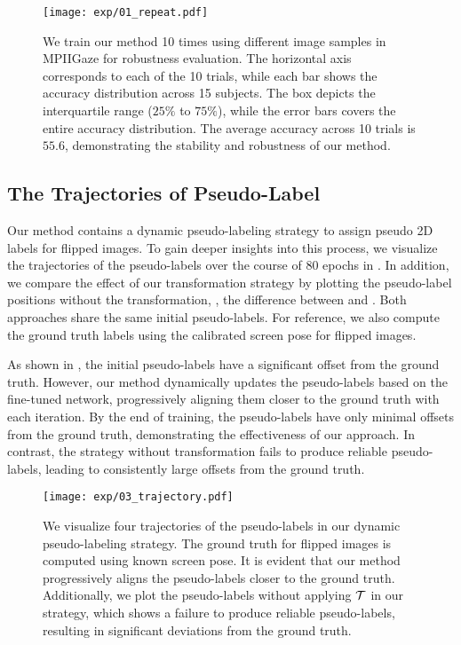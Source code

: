 \begin{figure}[t]
	\begin{center}
		\texttt{[image: exp/01\_repeat.pdf]}	
	\end{center}
    \vspace{-2mm}
	\caption{We train our method 10 times using different image samples in MPIIGaze for robustness evaluation.  The horizontal axis corresponds to each of the 10 trials, while each bar shows the accuracy distribution across 15 subjects.  The box depicts the interquartile range ($25\%$ to $75\%$), while the error bars covers the entire accuracy distribution. The average accuracy across  10 trials is $55.6$, demonstrating the stability and robustness of our method. \vspace{-6mm} }
	\label{fig:repeat}
\end{figure}


\subsection{The Trajectories of Pseudo-Label}
Our method contains a dynamic pseudo-labeling strategy to assign pseudo 2D labels for flipped images. To gain deeper insights into this process, we visualize the trajectories of the pseudo-labels over the course of 80 epochs in .
In addition, we compare the effect of our transformation strategy by plotting the pseudo-label positions without the transformation, \ie, the difference  between  and . 
Both approaches share the same initial pseudo-labels. For reference, we also compute the ground truth labels using the calibrated screen pose for flipped images.

As shown in  , the initial pseudo-labels have a significant offset from the ground truth. However, our method dynamically updates the pseudo-labels based on the fine-tuned network, progressively aligning them closer to the ground truth with each iteration. By the end of training, the pseudo-labels have only minimal offsets from the ground truth, demonstrating the effectiveness of our approach.
In contrast, the strategy without transformation fails to produce reliable pseudo-labels, leading to consistently large offsets from the ground truth. 

\begin{figure}[t]
	\begin{center}
		\texttt{[image: exp/03\_trajectory.pdf]}	
	\end{center}
    \vspace{-4mm}
	\caption{ We visualize four trajectories of the pseudo-labels in our dynamic pseudo-labeling strategy. The ground truth for flipped images is computed using known screen pose. It is evident that our method progressively aligns the pseudo-labels closer to the ground truth. Additionally, we plot the pseudo-labels without applying $\mathcal{T}$ in our strategy, which shows a failure to produce reliable pseudo-labels, resulting in significant deviations from the ground truth. \vspace{-4mm}}
	\label{fig:trajectory}
\end{figure}

